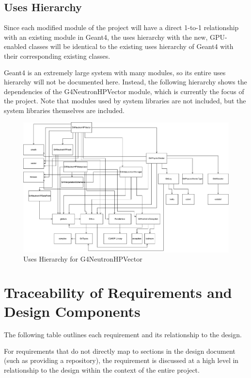 \documentclass[12pt]{article}
\begin{document}
\subsection{Uses Hierarchy}
Since each modified module of the project will have a direct 1-to-1 relationship with an existing module in Geant4, the uses hierarchy with the new, GPU-enabled classes will be identical to the existing uses hierarchy of Geant4 with their corresponding existing classes.

Geant4 is an extremely large system with many modules, so its entire uses hierarchy will not be documented here. Instead, the following hierarchy shows the dependencies of the G4NeutronHPVector module, which is currently the focus of the project. Note that modules used by system libraries are not included, but the system libraries themselves are included.

\begin{figure}[h]
\caption{Uses Hierarchy for G4NeutronHPVector}\label{imgUsesHierarchy}
\includegraphics[width=\textwidth]{uses_hierarchy.pdf}
\end{figure}
\FloatBarrier

\section{Traceability of Requirements and Design Components}%
The following table outlines each requirement and its relationship to the design.

For requirements that do not directly map to sections in the design document (such as providing a repository), the requirement is discussed at a high level in relationship to the design within the context of the entire project.
\end{document}
